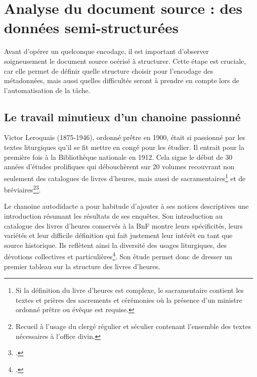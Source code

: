 \documentclass[a4paper,12pt,twoside]{book}
\begin{document}
	\section{Analyse du document source : des données semi-structurées}
	
	Avant d'opérer un quelconque encodage, il est important d'observer soigneusement le document source océrisé à structurer. Cette étape est cruciale, car elle permet de définir quelle structure choisir pour l'encodage des métadonnées, mais aussi quelles difficultés seront à prendre en compte lors de l'automatisation de la tâche. 
	
	\subsection{\label{Leroquais}Le travail minutieux d’un chanoine passionné}
	
	Victor Leroquais (1875-1946), ordonné prêtre en 1900, était si passionné par les textes liturgiques qu'il se fit mettre en congé pour les étudier. Il entrait pour la première fois à la Bibliothèque nationale en 1912. Cela signe le début de 30 années d'études prolifiques qui débouchèrent sur 20 volumes recouvrant non seulement des catalogues de livres d'heures, mais aussi de sacramentaires\footnote{Si la définition du livre d'heures est complexe, le sacramentaire contient les textes et prières des sacrements et cérémonies où la présence d'un ministre ordonné prêtre ou évêque est requise.} et de bréviaires\footnote{Recueil à l'usage du clergé régulier et séculier contenant l'ensemble des textes nécessaires à l'office divin.}\footcite{V_L}.
	
	Le chanoine autodidacte a pour habitude d'ajouter à ses notices descriptives une introduction résumant les résultats de ses enquêtes. Son introduction au catalogue des livres d'heures conservés à la BnF montre leurs spécificités, leurs variétés et leur difficile définition qui fait justement leur intérêt en tant que source historique. Ils reflètent ainsi la diversité des usages liturgiques, des dévotions collectives et particulières\footcite[p. I-LXXXV]{Leroquais_notices}. Son étude permet donc de dresser un premier tableau sur la structure des livres d'heures.\\
	
\end{document}
